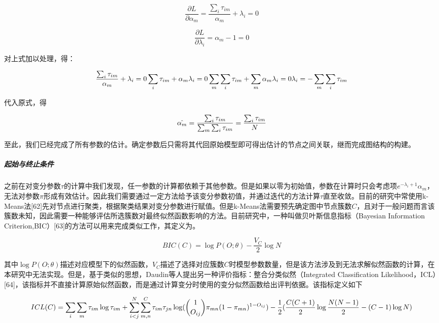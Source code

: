 \documentclass[
]{article}
\begin{document}
\[\frac{\partial L}{\partial \alpha_m}=\frac{\sum_i\tau_{im}}{\alpha_m}+\lambda_i=0\]

\[\frac{\partial L}{\partial \lambda_i}=\alpha_{m}-1=0\]

对上式加以处理，得：

\[\frac{\sum_i\tau_{im}}{\alpha_m}+\lambda_i=0\\
\sum_i\tau_{im}+\alpha_m\lambda_i=0\\
\sum_m\sum_i\tau_{im}+\sum_m\alpha_m\lambda_i=0\\
\lambda_i=-\sum_m\sum_i\tau_{im}\]

代入原式，得

\[\hat{\alpha_m}=\frac{\sum_i\tau_{im}}{\sum_m\sum_i\tau_{im}}\\
=\frac{\sum_i\tau_{im}}{N}\]

至此，我们已经完成了所有参数的估计。确定参数后只需将其代回原始模型即可得出估计的节点之间关联，继而完成图结构的构建。

\hypertarget{ux8d77ux59cbux4e0eux7ec8ux6b62ux6761ux4ef6}{%
\subparagraph{起始与终止条件}\label{ux8d77ux59cbux4e0eux7ec8ux6b62ux6761ux4ef6}}

之前在对变分参数\(\tau\)的计算中我们发现，任一参数的计算都依赖于其他参数。但是如果以零为初始值，参数在计算时只会考虑项\(e^{-\lambda_i+1}\alpha_m\)，无法对参数\(\pi\)形成有效估计。因此我们需要通过一定方法给予该变分参数初值，并通过迭代的方法计算\(\tau\)直至收敛。目前的研究中常使用k-Means法{[}62{]}先对节点进行聚类，根据聚类结果对变分参数进行赋值。但是k-Means法需要预先确定图中节点簇数\(C\)，且对于一般问题而言该簇数未知，因此需要一种能够评估所选簇数对最终似然函数影响的方法。目前研究中，一种叫做贝叶斯信息指标（Bayesian
Information
Criterion,BIC）{[}63{]}的方法可以用来完成类似工作，其定义为。

\[BIC(C)=\log P(O;\theta)-\frac{V_C}{2}\log N\]

其中\(\log P(O;\theta)\)描述对应模型下的似然函数，\(V_C\)描述了选择对应簇数\(C\)时模型参数数量，但是该方法涉及到无法求解似然函数的计算，在本研究中无法实现。但是，基于类似的思想，Daudin等人提出另一种评价指标：整合分类似然（Integrated
Classification
Likelihood，ICL）{[}64{]}，该指标并不直接计算原始似然函数，而是通过计算变分时使用的变分似然函数给出评判依据。该指标定义如下

\[ICL(C)=\sum_i\sum_m\tau_{im} \log \tau_{im} +\sum_{i<j}^N\sum_{m,n}^C\tau_{im}\tau_{jn}\log ( \binom{1}{O_{ij}}\pi_{mn}(1-\pi_{mn})^{1-O_{ij}})\\-\frac{1}{2}(\frac{C(C+1)}{2}\log \frac{N(N-1)}{2}-(C-1)\log N)\]
\end{document}

